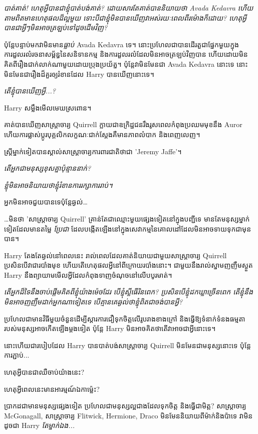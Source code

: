 {{{{{{{\emph{បាត់គាត់! ហេតុអ្វីបានជាខ្ញុំបាត់បង់គាត់? ដោយសារតែគាត់បាននិយាយថា Avada Kedavra ហើយតាមពិតមានហេតុផលដ៏ល្អមួយ ទោះបីជាខ្ញុំមិនបានឃើញវាអស់រយៈពេលពីរម៉ោងក៏ដោយ? ហេតុអ្វីបានជាអ្វីៗមិនអាចត្រឡប់ទៅដូចដើមវិញ?}

ប៉ុន្តែបន្ទាប់មកវាមិនមាន\emph{ធ្លាប់} Avada Kedavra ទេ។ នោះប្រហែលជាបានដើរតួជាផ្នែកមួយក្នុងការដួលរលំរចនាសម្ព័ន្ធនៃសនិទានកម្ម និងការដួលរលំដែលមិនអាចត្រឡប់វិញបាន ហើយដោយមិនគិតពីរឿងជាក់លាក់ណាមួយដោយប្រុងប្រយ័ត្ន។ ប៉ុន្តែវាមិនមែនជា Avada Kedavra នោះទេ នោះមិនមែនជារឿងដ៏គួរឲ្យរំខានដែល Harry បានឃើញនោះទេ។

\emph{តើខ្ញុំបានឃើញអ្វី...?}

Harry សម្លឹងមើលមេឃស្រពោន។

គាត់បានឃើញសាស្រ្តាចារ្យ Quirrell ក្លាយជាឧក្រិដ្ឋជនរឹងរូសពេលកំពុងប្រឈមមុខនឹង Auror ហើយការផ្លាស់ប្តូរបុគ្គលិកលក្ខណៈជាក់ស្តែងគឺមានភាពលំបាក និងពេញលេញ។

ស្ត្រី​ម្នាក់​ទៀត​បាន​ស្គាល់​សាស្ត្រាចារ្យ​ការពារ​ជាតិ​ថា​ជា 'Jeremy Jaffe'។

\emph{តើអ្នកជាមនុស្សខុសគ្នាប៉ុន្មាននាក់?}

\emph{ខ្ញុំ​មិន​អាច​និយាយ​ថា​ខ្ញុំ​រំខាន​ការ​រក្សា​ការ​រាប់​។}

អ្នក​មិន​អាច​ជួយ​បាន​ទេ​ប៉ុន្តែ​ឆ្ងល់…

…មិនថា 'សាស្រ្តាចារ្យ Quirrell' គ្រាន់តែជាឈ្មោះមួយផ្សេងទៀតនៅក្នុងបញ្ជីទេ មានតែមនុស្សម្នាក់ទៀតដែលមានតម្លៃ \emph{ប្រែជា} ដែលបង្កើតឡើងនៅក្នុងសេវាកម្មនៃគោលដៅដែលមិនអាចទាយទុកជាមុនបាន។

Harry តែងតែឆ្ងល់នៅពេលនេះ រាល់ពេលដែលគាត់និយាយជាមួយសាស្រ្តាចារ្យ Quirrell ប្រសិនបើវាជារបាំងមុខ ហើយតើហេតុផលអ្វីនៅពីក្រោយរបាំងនោះ។ ជាមួយនឹងរាល់ស្នាមញញឹមស្ងួត Harry នឹងព្យាយាមមើលអ្វីដែលកំពុងទាញចំណុចនៅលើបបូរមាត់។

\emph{តើអ្នកដ៏ទៃនឹងចាប់ផ្តើមគិតពីខ្ញុំយ៉ាងម៉េចដែរ បើខ្ញុំស្លីធើរិនពេក? ប្រសិន​បើ​ខ្ញុំ​ដក​ឃ្លា​ច្រើន​ពេក តើ​ខ្ញុំ​នឹង​មិន​អាច​ញញឹម​ដាក់​អ្នក​ណា​ទៀត​ទេ បើ​គ្មាន​គេ​ឆ្ងល់​ថា​ខ្ញុំ​ពិត​ជា​ចង់​បាន​អ្វី?}

ប្រហែលជាមានវិធីមួយចំនួនដើម្បីស្ដារការជឿទុកចិត្តលើរូបរាងខាងក្រៅ និងធ្វើឱ្យទំនាក់ទំនងធម្មតារបស់មនុស្សអាចកើតឡើងម្តងទៀត ប៉ុន្តែ Harry មិនអាចគិតថាតើវាអាចជាអ្វីនោះទេ។

នោះហើយជារបៀបដែល Harry បានបាត់បង់សាស្រ្តាចារ្យ Quirrell មិនមែនជាមនុស្សនោះទេ ប៉ុន្តែការភ្ជាប់...

ហេតុ​អ្វី​បាន​ជា​ឈឺ​ចាប់​យ៉ាង​នេះ?

ហេតុអ្វីពេលនេះមានអារម្មណ៍ឯកាម្ល៉េះ?

ប្រាកដ​ជា​មាន​មនុស្ស​ផ្សេង​ទៀត ប្រហែល​ជា​មនុស្ស​ល្អ​ជាង​ដែល​ទុក​ចិត្ត និង​ធ្វើ​ជា​មិត្ត? សាស្រ្តាចារ្យ McGonagall, សាស្រ្តាចារ្យ Flitwick, Hermione, Draco មិន​មែន​និយាយ​ពី​ម៉ាក់​និង​ប៉ា​ទេ វា​មិន​ដូច​ជា Harry \emph{តែម្នាក់ឯង...}

}}}}}}}

